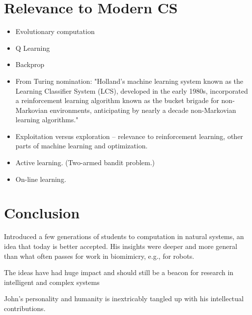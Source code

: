 \documentclass{sig-alternate}
\begin{document}
\section{Relevance to Modern CS}

\begin{itemize}
\item Evolutionary computation
\item Q Learning
\item Backprop
\item    From Turing nomination: "Holland's machine learning system known as the
   Learning Classifier System (LCS), developed in the early 1980s,
   incorporated a reinforcement learning algorithm known as the bucket
   brigade for non-Markovian environments, anticipating by nearly a
   decade non-Markovian learning algorithms."
\item Exploitation versus exploration -- relevance to reinforcement
  learning, other parts of machine learning and optimization.
\item Active learning.  (Two-armed bandit problem.) 
\item On-line learning.  
\end{itemize}

\section{Conclusion}

Introduced a few generations of students to computation in natural systems, an idea that today is better accepted.  His insights were deeper and more general than what often passes for work in biomimicry, e.g., for robots.

The ideas have had huge impact and should still be a beacon for research in intelligent and complex systems

John's personality and humanity is inextricably tangled up with his intellectual contributions.




\end{document}
